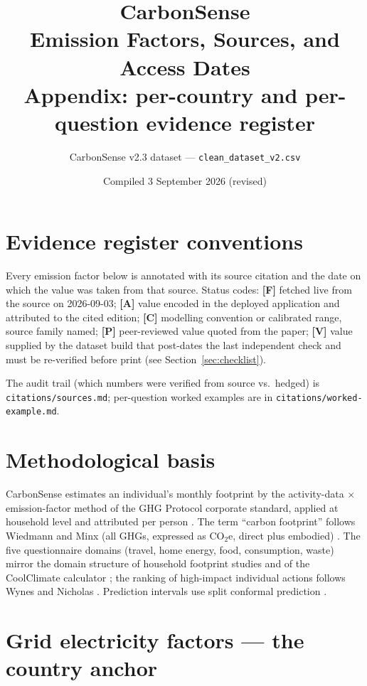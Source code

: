 \documentclass[11pt,a4paper]{article}
\title{\textbf{CarbonSense}\\ \Large Emission Factors, Sources, and Access Dates\\
\large Appendix: per-country and per-question evidence register}
\author{CarbonSense v2.3 dataset --- \texttt{clean\_dataset\_v2.csv}}
\date{Compiled 3 September 2026 (revised)}
\begin{document}
\maketitle

\section*{Evidence register conventions}

Every emission factor below is annotated with its source citation and the
date on which the value was taken from that source. Status codes:
\textbf{[F]} fetched live from the source on 2026-09-03;
\textbf{[A]} value encoded in the deployed application and attributed to
the cited edition;
\textbf{[C]} modelling convention or calibrated range, source family named;
\textbf{[P]} peer-reviewed value quoted from the paper;
\textbf{[V]} value supplied by the dataset build that post-dates the last
independent check and must be re-verified before print (see
Section~\ref{sec:checklist}).

The audit trail (which numbers were verified from source vs.\ hedged) is
\texttt{citations/sources.md}; per-question worked examples are in
\texttt{citations/worked-example.md}.

\section{Methodological basis}
\label{sec:method}

CarbonSense estimates an individual's monthly footprint by the
activity-data $\times$ emission-factor method of the GHG Protocol
corporate standard, applied at household level and attributed per person
\cite{ghgprotocol2004}. The term ``carbon footprint'' follows Wiedmann and
Minx (all GHGs, expressed as CO$_2$e, direct plus embodied)
\cite{wiedmann2008}. The five questionnaire domains (travel, home energy,
food, consumption, waste) mirror the domain structure of household
footprint studies \cite{ivanova2016} and of the CoolClimate calculator
\cite{jones2011}; the ranking of high-impact individual actions follows
Wynes and Nicholas \cite{wynes2017}. Prediction intervals use split
conformal prediction \cite{lei2018, angelopoulos2021}.

\section{Grid electricity factors --- the country anchor}
\label{sec:grid}
\end{document}
